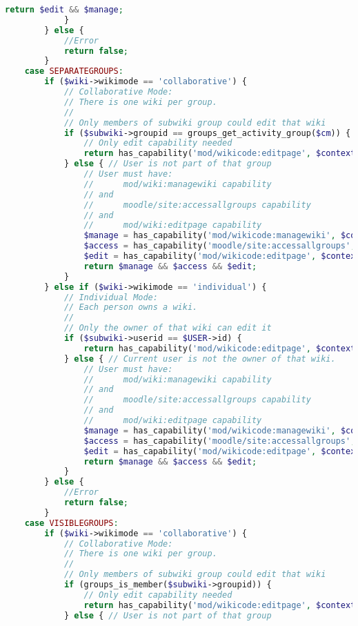 \begin{lstlisting}[language=PHP]
                return $edit && $manage;
            }
        } else {
            //Error
            return false;
        }
    case SEPARATEGROUPS:
        if ($wiki->wikimode == 'collaborative') {
            // Collaborative Mode:
            // There is one wiki per group.
            //
            // Only members of subwiki group could edit that wiki
            if ($subwiki->groupid == groups_get_activity_group($cm)) {
                // Only edit capability needed
                return has_capability('mod/wikicode:editpage', $context);
            } else { // User is not part of that group
                // User must have:
                //      mod/wiki:managewiki capability
                // and
                //      moodle/site:accessallgroups capability
                // and
                //      mod/wiki:editpage capability
                $manage = has_capability('mod/wikicode:managewiki', $context);
                $access = has_capability('moodle/site:accessallgroups', $context);
                $edit = has_capability('mod/wikicode:editpage', $context);
                return $manage && $access && $edit;
            }
        } else if ($wiki->wikimode == 'individual') {
            // Individual Mode:
            // Each person owns a wiki.
            //
            // Only the owner of that wiki can edit it
            if ($subwiki->userid == $USER->id) {
                return has_capability('mod/wikicode:editpage', $context);
            } else { // Current user is not the owner of that wiki.
                // User must have:
                //      mod/wiki:managewiki capability
                // and
                //      moodle/site:accessallgroups capability
                // and
                //      mod/wiki:editpage capability
                $manage = has_capability('mod/wikicode:managewiki', $context);
                $access = has_capability('moodle/site:accessallgroups', $context);
                $edit = has_capability('mod/wikicode:editpage', $context);
                return $manage && $access && $edit;
            }
        } else {
            //Error
            return false;
        }
    case VISIBLEGROUPS:
        if ($wiki->wikimode == 'collaborative') {
            // Collaborative Mode:
            // There is one wiki per group.
            //
            // Only members of subwiki group could edit that wiki
            if (groups_is_member($subwiki->groupid)) {
                // Only edit capability needed
                return has_capability('mod/wikicode:editpage', $context);
            } else { // User is not part of that group

\end{lstlisting}

